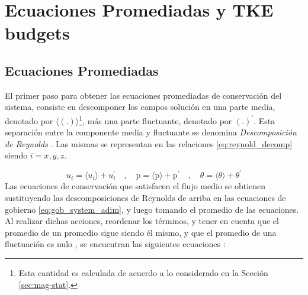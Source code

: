 \chapter{Ecuaciones Promediadas y TKE budgets } \label{apen:budgets}


\section{Ecuaciones Promediadas}


El primer paso para obtener las ecuaciones promediadas de conservación del sistema, consiste en descomponer los campos solución en una parte media, denotado por $\langle (\text{.}) \rangle$\footnote{Esta cantidad es calculada de acuerdo a lo considerado en la Sección \ref{sec:mag-stat}.}, más una parte fluctuante, denotado por $(\text{.})^{\prime}$. Esta separación entre la componente media y fluctuante se denomina \textit{Descomposición de Reynolds} \cite{kundu,pope2001turbulent}. Las mismas se representan en las relaciones \ref{eq:reynold_decomp} siendo $i=x,y,z$. 

\begin{equation}
u_i = \langle u_i \rangle + u^{\prime}_i \quad , \quad \text{p} = \langle \text{p} \rangle + \text{p}^{\prime} \quad , \quad \theta = \langle \theta \rangle + \theta^{\prime}
\label{eq:reynold_decomp}
\end{equation}
Las ecuaciones de conservación que satisfacen el flujo medio se obtienen sustituyendo las descomposiciones de Reynolds de arriba en las ecuaciones de gobierno \ref{eq:gob_system_adim}, y luego tomando el promedio de las ecuaciones. Al realizar dichas acciones, reordenar los términos, y tener en cuenta que el promedio de un promedio sigue siendo él mismo, y que el promedio de una fluctuación es nulo \cite{pope2001turbulent}, se encuentran las siguientes ecuaciones \cite{kundu}:

